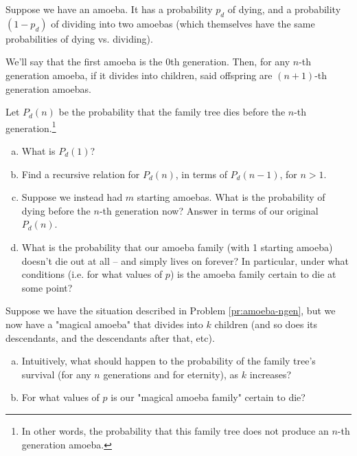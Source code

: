 
\begin{problem}
\label{pr:amoeba-ngen}
Suppose we have an amoeba. It has a probability $p_d$ of dying, and a probability $(1 - p_d)$ of dividing into two amoebas (which themselves have the same probabilities of dying vs. dividing). 

We'll say that the first amoeba is the 0th generation. Then, for any $n$-th generation amoeba, if it divides into children, said offspring are $(n+1)$-th generation amoebas. 

Let $P_d(n)$ be the probability that the family tree dies before the $n$-th generation.\footnote{In other words, the probability that this family tree does not produce an $n$-th generation amoeba.}


\begin{enumerate}[(a)]
\item What is $P_d(1)$?
\item Find a recursive relation for $P_d(n)$, in terms of $P_d(n-1)$, for $n > 1$. 
\item Suppose we instead had $m$ starting amoebas. What is the probability of dying before the $n$-th generation now? Answer in terms of our original $P_d(n)$.
\item What is the probability that our amoeba family (with 1 starting amoeba) doesn't die out at all -- and simply lives on forever? In particular, under what conditions (i.e. for what values of $p$) is the amoeba family certain to die at some point?
\end{enumerate}
\hfill
\end{problem}


\begin{problem}
\label{pr:amoeba-kdesc}
Suppose we have the situation described in Problem \ref{pr:amoeba-ngen}, but we now have a "magical amoeba" that divides into $k$ children (and so does its descendants, and the descendants after that, etc). 

\begin{enumerate}[(a)]
\item Intuitively, what should happen to the probability of the family tree's survival (for any $n$ generations and for eternity), as $k$ increases?
\item For what values of $p$ is our "magical amoeba family" certain to die?
\end{enumerate}
\end{problem}

